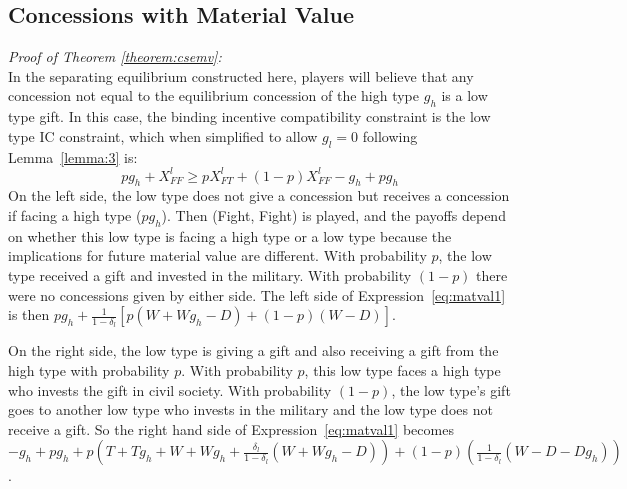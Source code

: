 \documentclass[12pt, letterpaper]{article}
\newcommand{\de}{\delta}
\begin{document}
{\subsection{Concessions with Material Value}
\label{ap:mat_val}
\emph{Proof of Theorem \ref{theorem:csemv}:}\\
In the separating equilibrium constructed here, players will believe that any concession not equal to the equilibrium concession of the high type $g_h$ is a low type gift. In this case, the binding incentive compatibility constraint is the low type IC constraint, which when simplified to allow $g_l=0$ following Lemma~\ref{lemma:3} is: 
\begin{equation}
	pg_h +X_{FF}^l \geq pX_{FT}^l+(1-p)X_{FF}^l-g_h+pg_h
	\label{eq:matval1}
\end{equation}
On the left side, the low type does not give a concession but receives a concession if facing a high type ($pg_h$). Then (Fight, Fight) is played, and the payoffs depend on whether this low type is facing a high type or a low type because the implications for future material value are different. With probability $p$, the low type received a gift and invested in the military. With probability $(1-p)$ there were no concessions given by either side. The left side of Expression~\ref{eq:matval1} is then $pg_h + \frac{1}{1-\de_l}\left[p(W+Wg_h-D) + (1-p)(W-D) \right]$.

On the right side, the low type is giving a gift and also receiving a gift from the high type with probability $p$. With probability $p$, this low type faces a high type who invests the gift in civil society. With probability $(1-p)$, the low type's gift goes to another low type who invests in the military and the low type does not receive a gift. So the right hand side of Expression~\ref{eq:matval1} becomes $-g_h + pg_h + p\left(T + Tg_h +W + Wg_h + \frac{\de_l}{1-\de_l}\left(W + Wg_h-D \right) \right) + (1-p)\left( \frac{1}{1-\de_l}\left(W-D-Dg_h \right) \right)$.

}
\end{document}
